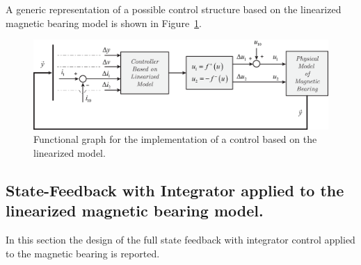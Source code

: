 \documentclass[11pt,a4paper,oneside]{book}
\numberwithin{equation}{section}
\theoremstyle{it}
\theoremstyle{definition}
\begin{document}
A generic representation of a possible control structure based on the linearized magnetic bearing model is shown in Figure~\ref{magnetic_bearing_control}.
\begin{figure}[H]
	\centering
	\includegraphics[width = 425pt, angle = 0, 
	keepaspectratio]{figures/magnetic_bearing/magnetic_bearing_control_1.eps}
	\captionsetup{width=0.5\textwidth, font=small}	
	\caption{Functional graph for the implementation of a control based on the linearized model.}
	\label{magnetic_bearing_control}
\end{figure}

\subsection{State-Feedback with Integrator applied to the linearized magnetic bearing model.}	
In this section the design of the full state feedback with integrator control applied to the magnetic bearing is reported.
\end{document}
